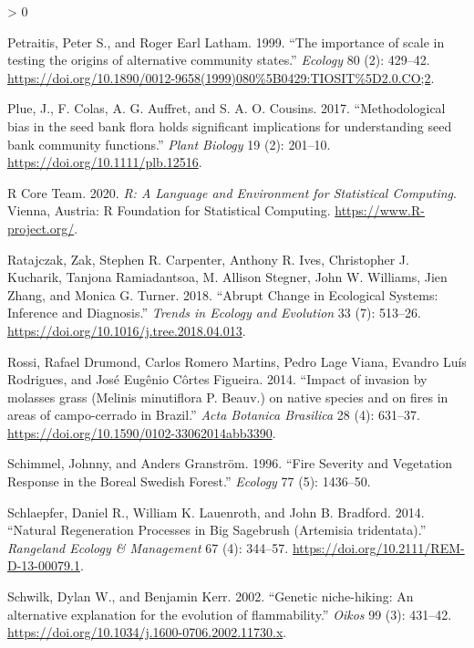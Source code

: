 \documentclass[
  12pt,
]{article}
\newlength{\cslhangindent}
\newenvironment{CSLReferences}[2] %
 {%
  \setlength{\parindent}{0pt}
  \ifodd #1 \everypar{\setlength{\hangindent}{\cslhangindent}}\ignorespaces\fi
  \ifnum #2 > 0
  \setlength{\parskip}{#2\baselineskip}
  \fi
 }%
 {}
\begin{document}
\begin{CSLReferences}{1}{0}
\leavevmode\hypertarget{ref-Petraitis1999}{}%
Petraitis, Peter S., and Roger Earl Latham. 1999. {``{The importance of
scale in testing the origins of alternative community states}.''}
\emph{Ecology} 80 (2): 429--42.
\url{https://doi.org/10.1890/0012-9658(1999)080\%5B0429:TIOSIT\%5D2.0.CO;2}.

\leavevmode\hypertarget{ref-Plue2017}{}%
Plue, J., F. Colas, A. G. Auffret, and S. A. O. Cousins. 2017.
{``{Methodological bias in the seed bank flora holds significant
implications for understanding seed bank community functions}.''}
\emph{Plant Biology} 19 (2): 201--10.
\url{https://doi.org/10.1111/plb.12516}.

\leavevmode\hypertarget{ref-R}{}%
R Core Team. 2020. \emph{R: A Language and Environment for Statistical
Computing}. Vienna, Austria: R Foundation for Statistical Computing.
\url{https://www.R-project.org/}.

\leavevmode\hypertarget{ref-Ratajczak2018}{}%
Ratajczak, Zak, Stephen R. Carpenter, Anthony R. Ives, Christopher J.
Kucharik, Tanjona Ramiadantsoa, M. Allison Stegner, John W. Williams,
Jien Zhang, and Monica G. Turner. 2018. {``{Abrupt Change in Ecological
Systems: Inference and Diagnosis}.''} \emph{Trends in Ecology and
Evolution} 33 (7): 513--26.
\url{https://doi.org/10.1016/j.tree.2018.04.013}.

\leavevmode\hypertarget{ref-Rossi2014}{}%
Rossi, Rafael Drumond, Carlos Romero Martins, Pedro Lage Viana, Evandro
Luís Rodrigues, and José Eugênio Côrtes Figueira. 2014. {``{Impact of
invasion by molasses grass (Melinis minutiflora P. Beauv.) on native
species and on fires in areas of campo-cerrado in Brazil}.''} \emph{Acta
Botanica Brasilica} 28 (4): 631--37.
\url{https://doi.org/10.1590/0102-33062014abb3390}.

\leavevmode\hypertarget{ref-Schimmel1996}{}%
Schimmel, Johnny, and Anders Granström. 1996. {``{Fire Severity and
Vegetation Response in the Boreal Swedish Forest}.''} \emph{Ecology} 77
(5): 1436--50.

\leavevmode\hypertarget{ref-Schlaepfer2014}{}%
Schlaepfer, Daniel R., William K. Lauenroth, and John B. Bradford. 2014.
{``{Natural Regeneration Processes in Big Sagebrush (Artemisia
tridentata)}.''} \emph{Rangeland Ecology \& Management} 67 (4): 344--57.
\url{https://doi.org/10.2111/REM-D-13-00079.1}.

\leavevmode\hypertarget{ref-Schwilk2002}{}%
Schwilk, Dylan W., and Benjamin Kerr. 2002. {``{Genetic niche-hiking: An
alternative explanation for the evolution of flammability}.''}
\emph{Oikos} 99 (3): 431--42.
\url{https://doi.org/10.1034/j.1600-0706.2002.11730.x}.


\end{CSLReferences}
\end{document}
